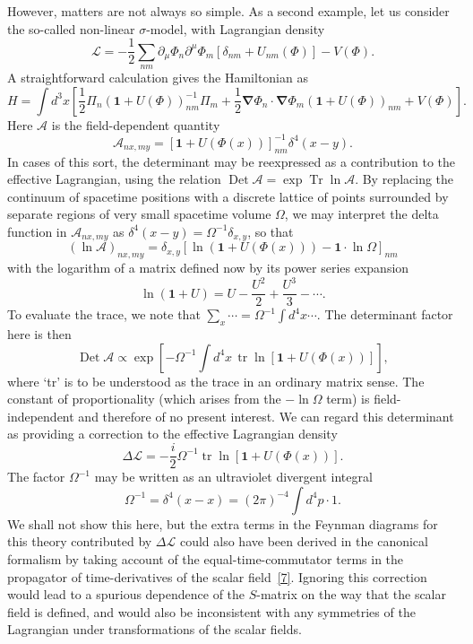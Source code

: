 However, matters are not always so simple. As a second example, let us
consider the so-called non-linear $\sigma$-model, with Lagrangian density
\[
\mathcal L=-\frac12\sum_{nm}\partial_\mu\Phi_n\partial^\mu\Phi_m
 [\delta_{nm}+U_{nm}(\Phi)]-V(\Phi).
\]
A straightforward calculation gives the Hamiltonian as
\[
H=\int d^3x\left[\frac12\Pi_n(\mathbf{1}+U(\Phi))^{-1}_{nm}\Pi_m
 +\frac12\boldsymbol\nabla\Phi_n\cdot\boldsymbol\nabla\Phi_m
 (\mathbf{1}+U(\Phi))_{nm}+V(\Phi)\right].
\]
Here $\mathcal A$ is the field-dependent quantity
\[
\mathcal A_{nx,my}=[\mathbf{1}+U(\Phi(x))]^{-1}_{nm}\delta^4(x-y).
\]
In cases of this sort, the determinant may be reexpressed as a contribution to
the effective Lagrangian, using the relation
$\operatorname{Det}\mathcal A=\exp\operatorname{Tr}\ln\mathcal A$. By
replacing the continuum of spacetime positions with a discrete lattice of
points surrounded by separate regions of very small spacetime volume $\Omega$,
we may interpret the delta function in $\mathcal A_{nx,my}$ as
$\delta^4(x-y)=\Omega^{-1}\delta_{x,y}$, so that
\[
(\ln\mathcal A)_{nx,my}=\delta_{x,y}
 \left[\ln(\mathbf{1}+U(\Phi(x)))-\mathbf{1}\cdot\ln\Omega\right]_{nm}
\]
with the logarithm of a matrix defined now by its power series expansion
\[
\ln(\mathbf{1}+U)=U-\frac{U^2}{2}+\frac{U^3}{3}-\cdots.
\]
To evaluate the trace, we note that
$\sum_x\cdots=\Omega^{-1}\int d^4x\cdots$. The determinant factor here is
then
\[
\operatorname{Det}\mathcal A\propto
 \exp\left[-\Omega^{-1}\int d^4x\,
 \operatorname{tr}\ln[\mathbf{1}+U(\Phi(x))]\right],
\]
where `tr' is to be understood as the trace in an ordinary matrix sense. The
constant of proportionality (which arises from the $-\ln\Omega$ term) is
field-independent and therefore of no present interest. We can regard this
determinant as providing a correction to the effective Lagrangian density
\[
\Delta\mathcal L=-\frac{i}{2}\Omega^{-1}
 \operatorname{tr}\ln[\mathbf{1}+U(\Phi(x))].
\]
The factor $\Omega^{-1}$ may be written as an ultraviolet divergent integral
\[
\Omega^{-1}=\delta^4(x-x)=(2\pi)^{-4}\int d^4p\cdot1.
\]
We shall not show this here, but the extra terms in the Feynman diagrams for
this theory contributed by $\Delta\mathcal L$ could also have been derived in
the canonical formalism by taking account of the equal-time-commutator terms
in the propagator of time-derivatives of the scalar field~\hyperref[ref:9.7]{[7]}. Ignoring this
correction would lead to a spurious dependence of the $S$-matrix on the way
that the scalar field is defined, and would also be inconsistent with any
symmetries of the Lagrangian under transformations of the scalar fields.

